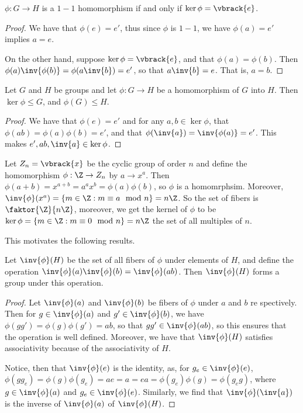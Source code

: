 \begin{lemma}\label{3.1.1}
    $\phi:G \rightarrow H$ is a $1-1$ homomorphism if and only if
    $\ker{\phi}=\vbrack{e}$.
\end{lemma}
\begin{proof}
    We have that $\phi(e)=e'$, thus since $\phi$ is $1-1$, we have $\phi(a)=e'$
    implies $a=e$.

    On the other hand, suppose $\ker{\phi}=\vbrack{e}$, and that
    $\phi(a)=\phi(b)$. Then $\phi(a)\inv{\phi(b)}=\phi(a\inv{b})=e'$, so that
    $a\inv{b}=e$. That is, $a=b$.
\end{proof}

\begin{lemma}\label{3.1.2}
    Let $G$ and  $H$ be groups and let  $\phi:G \rightarrow H$ be a homomorphism
    of $G$ into  $H$. Then $\ker{\phi} \leq G$, and $\phi(G) \leq H$.
\end{lemma}
\begin{proof}
    We have that $\phi(e)=e'$ and for any $a,b \in \ker{\phi}$, that
    $\phi(ab)=\phi(a)\phi(b)=e'$, and that $\phi(\inv{a})=\inv{\phi(a)}=e'$.
    This makes $e',ab, \inv{a} \in \ker{\phi}$.
\end{proof}

\begin{example}\label{3.1}
    Let $Z_n=\vbrack{x}$ be the cyclic group of order $n$ and define the
    homomorphism  $\phi:\Z \rightarrow Z_n$ by $a \rightarrow x^a$. Then
    $\phi(a+b)=x^{a+b}=a^ax^b=\phi(a)\phi(b)$, so $\phi$ is a homomrphsim.
    Moreover,  $\inv{\phi}(x^a)=\{m \in \Z : m \equiv a \mod{n}\}=n\Z$. So the
    set of fibers is $\faktor{\Z}{n\Z}$, moreover, we get the kernel of $\phi$
    to be  $\ker{\phi}=\{m \in \Z : m \equiv 0 \mod{n}\}=n\Z$ the set of all
    multiples of $n$.
\end{example}

This motivates the following results.

\begin{theorem}\label{3.1.3}
    Let $\inv{\phi}(H)$ be the set of all fibers of $\phi$ under elements of
    $H$, and define the operation $\inv{\phi}(a)\inv{\phi}(b)=\inv{\phi}(ab)$.
    Then $\inv{\phi}(H)$ forms a group under this operation.
\end{theorem}
\begin{proof}
    Let $\inv{\phi}(a)$ and $\inv{\phi}(b)$ be fibers of  $\phi$ under  $a$ and
     $b$ re spectively. Then for $g \in \inv{\phi}(a)$ and  $g' \in
     \inv{\phi}(b)$, we have  $\phi(gg')=\phi(g)\phi(g')=ab$, so that $gg' \in
     \inv{\phi}(ab)$, so this ensures that the operation is well defined.
     Moreover, we have that $\inv{\phi}(H)$ satisfies associativity because of
     the associativity of  $H$.

     Notice, then that  $\inv{\phi}(e)$ is the identity, as, for $g_e \in
     \inv{\phi}(e)$, $\phi(gg_e)=\phi(g)\phi(g_e)=ae=a=ea=\phi(g_e)\phi(g)=
     \phi(g_eg)$, where $g \in \inv{\phi}(a)$ and $g_e \in \inv{\phi}(e)$.
     Similarly, we find that $\inv{\phi}(\inv{a})$ is the inverse of $\inv{\phi}(a)$
     of $\inv{\phi}(H)$.
\end{proof}

